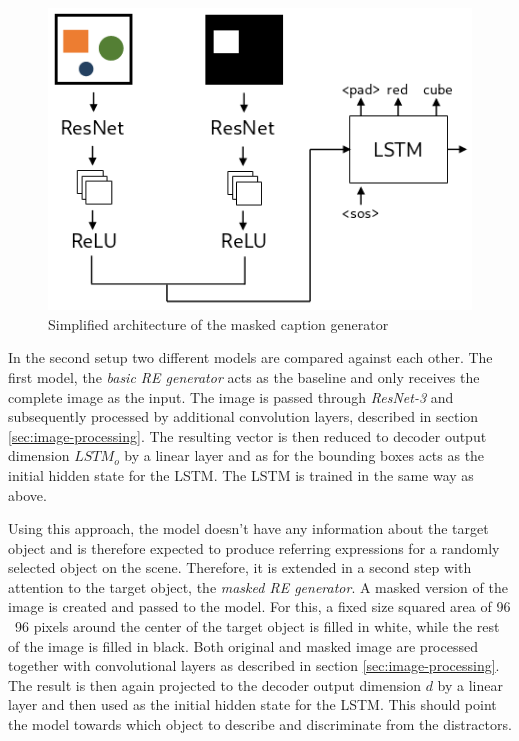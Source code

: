 \begin{figure}[ht]
    \centering
    \includegraphics[width=.5\linewidth]{figures/arch_caption_generator.png}
    \caption{Simplified architecture of the masked caption generator}
    \label{fig:caption_generator_architecture}
\end{figure}

In the second setup two different models are compared against each other.
The first model, the \emph{basic RE generator} acts as the baseline and only receives the complete image as the input.
The image is passed through \emph{ResNet-3} and subsequently processed by additional convolution layers, described in section \ref{sec:image-processing}.
The resulting vector is then reduced to decoder output dimension $LSTM_o$ by a linear layer and as for the bounding boxes acts as the initial hidden state for the LSTM.
The LSTM is trained in the same way as above.

Using this approach, the model doesn't have any information about the target object and is therefore expected to produce referring expressions for a randomly selected object on the scene.
Therefore, it is extended in a second step with attention to the target object, the \emph{masked RE generator}.
A masked version of the image is created and passed to the model.
For this, a fixed size squared area of 96 \times\ 96 pixels around the center of the target object is filled in white, while the rest of the image is filled in black.
Both original and masked image are processed together with convolutional layers as described in section \ref{sec:image-processing}.
The result is then again projected to the decoder output dimension $d$ by a linear layer and then used as the initial hidden state for the LSTM.
This should point the model towards which object to describe and discriminate from the distractors.

